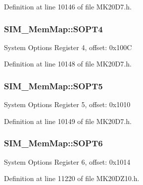 Definition at line 10146 of file M\+K20\+D7.\+h.

\subsubsection[{\texorpdfstring{S\+O\+P\+T4}{SOPT4}}]{ S\+I\+M\+\_\+\+Mem\+Map\+::\+S\+O\+P\+T4}\hypertarget{struct_s_i_m___mem_map_adf28cda65cea7072379ec6064d0d93cc}{}\label{struct_s_i_m___mem_map_adf28cda65cea7072379ec6064d0d93cc}
System Options Register 4, offset\+: 0x100C 

Definition at line 10148 of file M\+K20\+D7.\+h.

\subsubsection[{\texorpdfstring{S\+O\+P\+T5}{SOPT5}}]{ S\+I\+M\+\_\+\+Mem\+Map\+::\+S\+O\+P\+T5}\hypertarget{struct_s_i_m___mem_map_a19e2ddf391b1d9c03240be8267fdf781}{}\label{struct_s_i_m___mem_map_a19e2ddf391b1d9c03240be8267fdf781}
System Options Register 5, offset\+: 0x1010 

Definition at line 10149 of file M\+K20\+D7.\+h.

\subsubsection[{\texorpdfstring{S\+O\+P\+T6}{SOPT6}}]{ S\+I\+M\+\_\+\+Mem\+Map\+::\+S\+O\+P\+T6}\hypertarget{struct_s_i_m___mem_map_aa8030cdf04fef86a5fd4b10f7686e5fa}{}\label{struct_s_i_m___mem_map_aa8030cdf04fef86a5fd4b10f7686e5fa}
System Options Register 6, offset\+: 0x1014 

Definition at line 11220 of file M\+K20\+D\+Z10.\+h.

